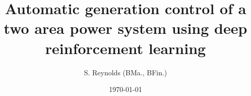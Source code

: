 \documentclass[12pt,oneside]{book}
\begin{document}
    \onehalfspace
  
    \title{Automatic generation control of a two area power system using deep reinforcement learning} 
    \author{S. Reynolds (BMa., BFin.)}
    
    \date{\today} 
    
    
    
    

    \frontmatter
    \maketitle
    \declaration
    
    

    \cleardoublepage
     {} 
    \tableofcontents

	\cleardoublepage
	 \label{listoffigures}
	\listoffigures
	
	\cleardoublepage
	 \label{listoftables} 
	\listoftables

	

	
	
    \cleardoublepage
    \mainmatter
    
    
    
    
    
    
    
\end{document}
